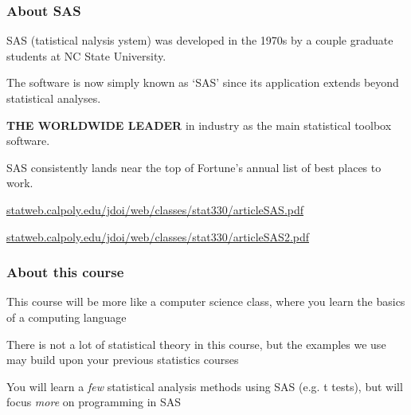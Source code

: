 \begin{frame}
\frametitle{About SAS}
\bi
\item SAS (tatistical nalysis ystem) was developed in the 1970s by a couple graduate students at NC State University.
\item The software is now simply known as `SAS' since its application extends beyond statistical analyses.
\item \textbf{THE WORLDWIDE LEADER} in industry as the main statistical toolbox software.
\item SAS consistently lands near the top of Fortune's annual list of best places to work.
\item \url{statweb.calpoly.edu/jdoi/web/classes/stat330/articleSAS.pdf}
\item \url{statweb.calpoly.edu/jdoi/web/classes/stat330/articleSAS2.pdf}
\ei
\end{frame}




\begin{frame}
\frametitle{About this course}
\bi
\item This course will be more like a computer science class, where you learn the basics of a computing language
\item There is not a lot of statistical theory in this course, but the examples we use may build upon your previous statistics courses
\item You will learn a \emph{few} statistical analysis methods using SAS (e.g. t tests), but will focus \emph{more} on programming in SAS
\ei
\end{frame}


